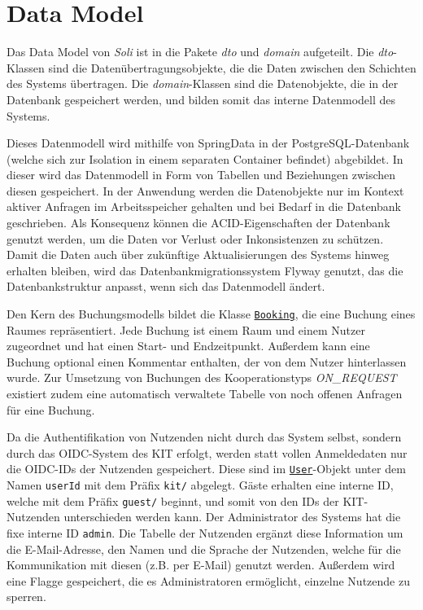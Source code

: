 
\chapter{Data Model}
\label{ch:data_model}

Das Data Model von \textit{Soli} ist in die Pakete \textit{dto} und \textit{domain} aufgeteilt.
Die \textit{dto}-Klassen sind die Datenübertragungsobjekte, die die Daten zwischen den Schichten des Systems übertragen.
Die \textit{domain}-Klassen sind die Datenobjekte, die in der Datenbank gespeichert werden, und bilden somit das interne Datenmodell des Systems.

Dieses Datenmodell wird mithilfe von \gls{SpringData} in der \gls{PostgreSQL}-Datenbank (welche sich zur Isolation in einem separaten \gls{Container} befindet) abgebildet.
In dieser wird das Datenmodell in Form von Tabellen und Beziehungen zwischen diesen gespeichert.
In der Anwendung werden die Datenobjekte nur im Kontext aktiver Anfragen im Arbeitsspeicher gehalten und bei Bedarf in die Datenbank geschrieben.
Als Konsequenz können die \gls{ACID}-Eigenschaften der Datenbank genutzt werden, um die Daten vor Verlust oder Inkonsistenzen zu schützen.
Damit die Daten auch über zukünftige Aktualisierungen des Systems hinweg erhalten bleiben, wird das Datenbankmigrationssystem \gls{Flyway} genutzt, das die Datenbankstruktur anpasst, wenn sich das Datenmodell ändert.

Den Kern des Buchungsmodells bildet die Klasse \hyperref[edu.kit.hci.soli.domain.Booking]{\texttt{Booking}}, die eine Buchung eines Raumes repräsentiert.
Jede Buchung ist einem Raum und einem Nutzer zugeordnet und hat einen Start- und Endzeitpunkt.
Außerdem kann eine Buchung optional einen Kommentar enthalten, der von dem Nutzer hinterlassen wurde.
Zur Umsetzung von Buchungen des Kooperationstyps \textit{ON\_REQUEST} existiert zudem eine automatisch verwaltete Tabelle von noch offenen Anfragen für eine Buchung.

Da die Authentifikation von Nutzenden nicht durch das System selbst, sondern durch das \gls{OIDC}-System des KIT erfolgt, werden statt vollen Anmeldedaten nur die OIDC-IDs der Nutzenden gespeichert.
Diese sind im \hyperref[edu.kit.hci.soli.domain.User]{\texttt{User}}-Objekt unter dem Namen \texttt{userId} mit dem Präfix \texttt{kit/} abgelegt.
Gäste erhalten eine interne ID, welche mit dem Präfix \texttt{guest/} beginnt, und somit von den IDs der KIT-Nutzenden unterschieden werden kann.
Der Administrator des Systems hat die fixe interne ID \texttt{admin}.
Die Tabelle der Nutzenden ergänzt diese Information um die E-Mail-Adresse, den Namen und die Sprache der Nutzenden, welche für die Kommunikation mit diesen (z.B. per E-Mail) genutzt werden.
Außerdem wird eine Flagge gespeichert, die es Administratoren ermöglicht, einzelne Nutzende zu sperren.

